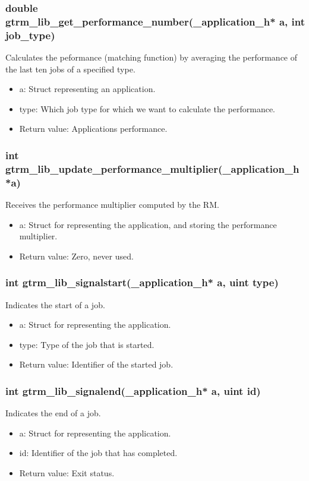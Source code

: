 \documentclass[nobiblatex]{LTHthesis}
\begin{document}
\subsubsection{double gtrm\_lib\_get\_performance\_number(\_application\_h* a, int job\_type)}
Calculates the peformance (matching function) by averaging the performance of the last ten jobs of a specified type.
\begin{itemize}
\item a: Struct representing an application.
\item type: Which job type for which we want to calculate the performance.
\item Return value: Applications performance.
\end{itemize}

\subsubsection{int gtrm\_lib\_update\_performance\_multiplier(\_application\_h *a)}
Receives the performance multiplier computed by the RM.
\begin{itemize}
\item a: Struct for representing the application, and storing the performance multiplier.
\item Return value: Zero, never used.
\end{itemize}

\subsubsection{int gtrm\_lib\_signalstart(\_application\_h* a, uint type)}
Indicates the start of a job.
\begin{itemize}
\item a: Struct for representing the application.
\item type: Type of the job that is started.
\item Return value: Identifier of the started job.
\end{itemize}

\subsubsection{int gtrm\_lib\_signalend(\_application\_h* a, uint id)}
Indicates the end of a job.
\begin{itemize}
\item a: Struct for representing the application.
\item id: Identifier of the job that has completed.
\item Return value: Exit status.
\end{itemize}
\end{document}
